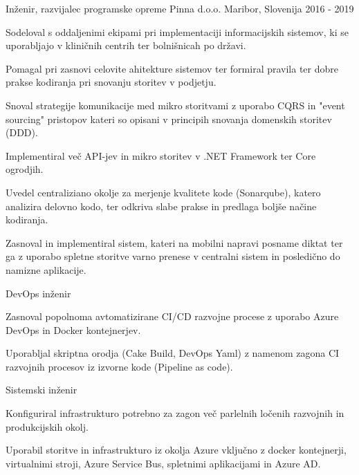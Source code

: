 \begin{cventries}
  \cventry
    {Inženir, razvijalec programske opreme} %
    {Pinna d.o.o.} %
    {Maribor, Slovenija} %
    {2016 - 2019} %
    {
      \begin{cvitems} %
        \item {Sodeloval s oddaljenimi ekipami pri implementaciji 
        informacijskih sistemov, ki se uporabljajo v kliničnih 
        centrih ter bolnišnicah po državi.}
        \item {Pomagal pri zasnovi celovite ahitekture sistemov ter 
        formiral pravila ter dobre prakse kodiranja pri snovanju storitev v podjetju.}
        \item {Snoval strategije komunikacije med mikro storitvami z uporabo 
        CQRS in "event sourcing" pristopov kateri so opisani v principih 
        snovanja domenskih storitev (DDD).}
        \item {Implementiral več API-jev in mikro storitev v .NET Framework 
        ter Core ogrodjih.}
        \item {Uvedel centraliziano okolje za merjenje kvalitete kode 
        (Sonarqube), katero analizira delovno kodo, ter odkriva slabe 
        prakse in predlaga boljše načine kodiranja.}
        \item {Zasnoval in implementiral sistem, kateri na mobilni
         napravi posname diktat ter ga z uporabo spletne storitve varno
          prenese v centralni sistem in posledično do namizne aplikacije.\\}
      \end{cvitems}
    }
    \cventry
    {DevOps inženir} %
    {} %
    {} %
    {} %
    {
      \begin{cvitems} %
        \item {Zasnoval popolnoma avtomatizirane CI/CD razvojne procese z 
        uporabo Azure DevOps in Docker kontejnerjev.}
        \item {Uporabljal skriptna orodja (Cake Build, DevOps Yaml) z
         namenom zagona CI razvojnih procesov iz izvorne kode (Pipeline as code).\\}
      \end{cvitems}
    }
    \cventry
    {Sistemski inženir} %
    {} %
    {} %
    {} %
    {
      \begin{cvitems} %
        \item {Konfiguriral infrastrukturo potrebno za zagon več
         parlelnih ločenih razvojnih in produkcijskih okolj.}
        \item {Uporabil storitve in infrastrukturo iz okolja Azure
         vključno z docker kontejnerji, virtualnimi stroji, Azure Service Bus,
          spletnimi aplikacijami in Azure AD.\\}
      \end{cvitems}
    }


\end{cventries}
